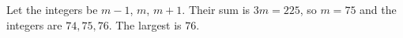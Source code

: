 Let the integers be $m-1$, $m$, $m+1$. Their sum is $3m=225$, so $m=75$ and the integers are $74,75,76$. The largest is $\boxed{76}$.
